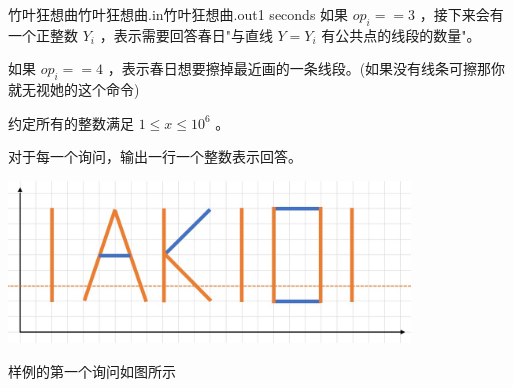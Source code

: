 \begin{problem}{竹叶狂想曲}{竹叶狂想曲.in}{竹叶狂想曲.out}{1 seconds}
如果 $op_i==3$ ，接下来会有一个正整数 $Y_i$ ，表示需要回答春日"与直线 $Y=Y_i$ 有公共点的线段的数量"。

如果 $op_i==4$ ，表示春日想要擦掉最近画的一条线段。(如果没有线条可擦那你就无视她的这个命令)

约定所有的整数满足 $1 \leq x \leq 10^6$ 。

\OutputFile

对于每一个询问，输出一行一个整数表示回答。

\Example

\begin{example}
%
\end{example}
\begin{center}
\includegraphics[width=0.8\textwidth]{pics/D.jpg}
\end{center}
样例的第一个询问如图所示
\end{problem}
